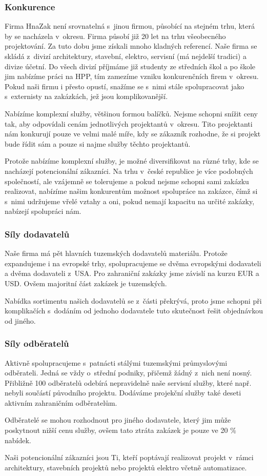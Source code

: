 \documentclass[a4paper, twoside, 11pt]{article}
\begin{document}
		\subsubsection{Konkurence}
			Firma HnaZak není srovnatelná s~jinou firmou, působící na stejném trhu, která by se nacházela v~okresu. Firma působí již 20 let na trhu všeobecného projektování. Za tuto dobu jsme získali mnoho kladných referencí. Naše firma se skládá z~divizí architektury, stavební, elektro, servisní (má nejdelší tradici) a divize účetní. Do všech divizí příjmáme již studenty ze středních škol a po škole jim nabízíme práci na HPP, tím zamezíme vzniku konkurenčních firem v~okresu. Pokud naši firmu i přesto opustí, snažíme se s~nimi stále spolupracovat jako s~externisty na zakázkách, jež jsou komplikovanější.\par
			Nabízíme komplexní služby, většinou formou balíčků. Nejsme schopni snížit ceny tak, aby odpovídali cenám jednotlivých projektantů v~okresu. Tito projektanti nám konkurují pouze ve velmi malé míře, kdy se zákazník rozhodne, že si projekt bude řídit sám a pouze si najme služby těchto projektantů.\par
			Protože nabízíme komplexní služby, je možné diversifikovat na různé trhy, kde se nacházejí potencionální zákazníci. Na trhu v~české republice je více podobných společností, ale vzájemně se tolerujeme a pokud nejsme schopni sami zakázku realizovat, nabízíme našim konkurentům možnost spolupráce na zakázce, čímž si s~nimi udržujeme vřelé vztahy a oni, pokud nemají kapacitu na určité zakázky, nabízejí spolupráci nám.
		\subsubsection{Síly dodavatelů}
			Naše firma má pět hlavních tuzemských dodavatelů materiálu. Protože expandujeme i na evropské trhy, spolupracujeme se dvěma evropskými dodavateli a dvěma dodavateli z~USA. Pro zahraniční zakázky jsme závislí na kurzu EUR a USD. Ovšem majoritní část zakázek je tuzemských.\par
			Nabídka sortimentu našich dodavatelů se z~části překrývá, proto jsme schopni při komplikačích s~dodáním od jednoho dodavatele tuto skutečnost řešit objednávkou od jiného.
		\subsubsection{Síly odběratelů}
			Aktivně spolupracujeme s~patnácti stálými tuzemskými průmyslovými odběrateli. Jedná se vždy o~střední podniky, přičemž žádný z~nich není nosný. Přibližně 100 odběratelů odebírá nepravidelně naše servisní služby, které např. nebyli součástí původního projektu. Dodáváme projekční služby také deseti aktivním zahraničním odběratelům.\par
			Odběratelé se mohou rozhodnout pro jiného dodavatele, který jim může poskytnout nižší cenu služby, ovšem tato ztráta zakázek je pouze ve 20 \% nabídek.\par
			Naši potencionální zákazníci jsou Ti, kteří poptávají realizovat projekt v~rámci architektury, stavebních projektů nebo projektů elektro včetně automatizace.
\end{document}
